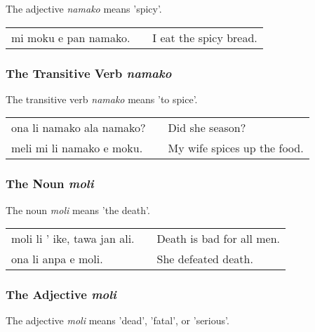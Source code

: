 The adjective \textit{namako} means 'spicy'. 

\begin{supertabular}{p{5,5cm}|ll}
mi moku e pan namako. && I eat the spicy bread. \\
\end{supertabular}

%
%
\subsubsection*{The Transitive Verb \textit{namako}}
%

The transitive verb \textit{namako} means 'to spice'. 

\begin{supertabular}{p{5,5cm}|ll}
ona li namako ala namako? && Did she season? \\
meli mi li namako e moku. &&  My wife spices up the food. \\
\end{supertabular}

%
%
\subsubsection*{The Noun \textit{moli}}
%
%

The noun \textit{moli} means 'the death'.

\begin{supertabular}{p{5,5cm}|ll}
moli li ' ike, tawa jan ali. && Death is bad for all men. \\
ona li anpa e moli. && She defeated death.  \\
\end{supertabular} 

%
%
\subsubsection*{The Adjective \textit{moli}}
%
%

The adjective \textit{moli} means 'dead', 'fatal', or 'serious'. 

